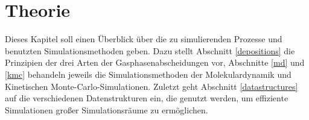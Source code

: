 \cleardoublepage
\chapter{Theorie}
\label{theory}

Dieses Kapitel soll einen Überblick über die zu simulierenden Prozesse und benutzten Simulationsmethoden geben.
Dazu stellt Abschnitt \ref{depositions} die Prinzipien der drei Arten der Gasphasenabscheidungen vor, Abschnitte \ref{md} und \ref{kmc} behandeln jeweils die Simulationsmethoden der Molekulardynamik und Kinetischen Monte-Carlo-Simulationen.
Zuletzt geht Abschnitt \ref{datastructures} auf die verschiedenen Datenstrukturen ein, die genutzt werden, um effiziente Simulationen großer Simulationsräume zu ermöglichen.


\clearpage

\clearpage

\clearpage

